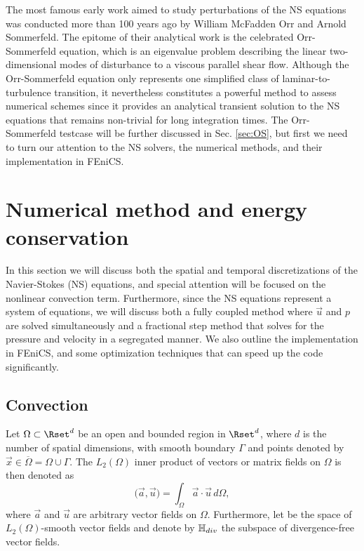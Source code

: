 The most famous early work aimed to study perturbations of the NS equations was conducted more than 100 years ago by William McFadden Orr and Arnold Sommerfeld. The epitome of their analytical work is the celebrated Orr-Sommerfeld equation, which is an eigenvalue problem describing the linear two-dimensional modes of disturbance to a viscous parallel shear flow. Although the Orr-Sommerfeld equation only represents one simplified class of laminar-to-turbulence transition, it nevertheless constitutes a powerful method to assess numerical schemes since it provides an analytical transient solution to the NS equations that remains non-trivial for long integration times. The Orr-Sommerfeld testcase will be further discussed in Sec. \ref{sec:OS}, but first we need to turn our attention to the NS solvers, the numerical methods, and their implementation in FEniCS.

\section{Numerical method and energy conservation}
\label{sec:Numerical}
In this section we will discuss both the spatial and temporal discretizations of the Navier-Stokes (NS) equations, and special attention will be focused on the nonlinear convection term. Furthermore, since the NS equations represent a system of equations, we will discuss both a fully coupled method where $\vec{u}$ and $p$ are solved simultaneously and a fractional step method that solves for the pressure and velocity in a segregated manner. We also outline the implementation in FEniCS, and some optimization techniques that can speed up the code significantly.

\subsection{Convection}
\label{sec:Convection}
Let $\Omega \subset \Rset^d$ be an open and bounded region in $\Rset^d$, where $d$ is the number of spatial dimensions, with smooth boundary $\Gamma$ and points denoted by $\vec{x}\in \overline{\Omega}=\Omega \cup \Gamma$. The $L_2(\Omega)$ inner product of vectors or matrix fields on $\Omega$ is then denoted as
\begin{equation}
 \bigl( \vec{a},\vec{u} \bigr) = \int_{\Omega} \vec{a}\cdot \vec{u}\, d\Omega,
 \label{eq:L2}
\end{equation}
where $\vec{a}$ and $\vec{u}$ are arbitrary vector fields on $\Omega$. Furthermore, let \Hset be the space of $L_2(\Omega)$-smooth vector fields and denote by $\mathbb{H}_{div}$ the subspace of divergence-free vector fields.

